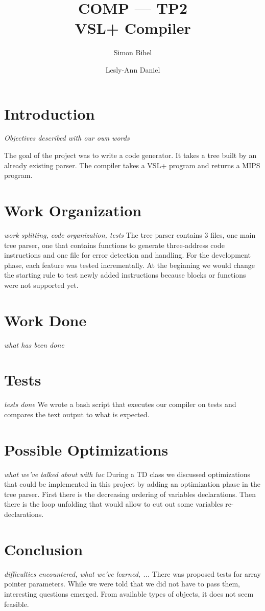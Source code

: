 \documentclass[a4paper,11pt,english]{article}
\title{COMP --- TP2\\VSL+ Compiler}
\author{Simon Bihel \and Lesly-Ann Daniel}
\begin{document}
\maketitle

\section{Introduction}
\textit{Objectives described with our own words}

The goal of the project was to write a code generator.
It takes a tree built by an already existing parser.
The compiler takes a VSL+ program and returns a MIPS program.

\section{Work Organization}
\textit{work splitting, code organization, tests}
The tree parser contains 3 files, one main tree parser, one that contains functions to generate three-address code instructions and one file for error detection and handling.
For the development phase, each feature was tested incrementally.
At the beginning we would change the starting rule to test newly added instructions because blocks or functions were not supported yet.

\section{Work Done}
\textit{what has been done}

\section{Tests}
\textit{tests done}
We wrote a bash script that executes our compiler on tests and compares the text output to what is expected.

\section{Possible Optimizations}
\textit{what we've talked about with luc}
During a TD class we discussed optimizations that could be implemented in this project by adding an optimization phase in the tree parser.
First there is the decreasing ordering of variables declarations.
Then there is the loop unfolding that would allow to cut out some variables re-declarations.

\section{Conclusion}
\textit{difficulties encountered, what we've learned, ...}
There was proposed tests for array pointer parameters.
While we were told that we did not have to pass them, interesting questions emerged.
From available types of objects, it does not seem feasible.
\end{document}
